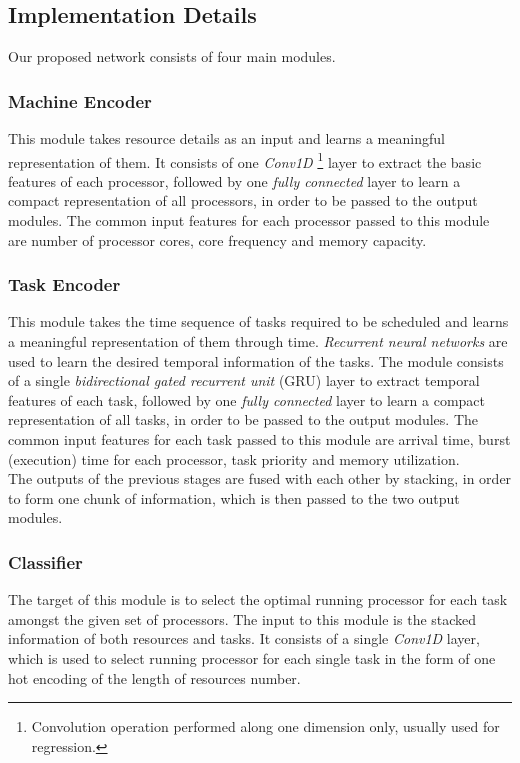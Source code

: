 \subsection{Implementation Details}
Our proposed network consists of four main modules.

\subsubsection{Machine Encoder}
This module takes resource details as an input and learns a meaningful representation of them. It consists of one \emph{Conv1D} \footnote{Convolution operation performed along one dimension only, usually used for regression.} layer to extract the basic features of each processor, followed by one \emph{fully connected} layer to learn a compact representation of all processors, in order to be passed to the output modules. The common input features for each processor passed to this module are number of processor cores, core frequency and memory capacity. \\

\subsubsection{Task Encoder}
This module takes the time sequence of tasks required to be scheduled and learns a meaningful representation of them through time. \emph{Recurrent neural networks} are used to learn the desired temporal information of the tasks. The module consists of a single \emph{bidirectional gated recurrent unit} (GRU) \cite{chung2014empirical} layer to extract temporal features of each task, followed by one \emph{fully connected} layer to learn a compact representation of all tasks, in order to be passed to the output modules. The common input features for each task passed to this module are arrival time, burst (execution) time for each processor, task priority and memory utilization. \\

The outputs of the previous stages are fused with each other by stacking, in order to form one chunk of information, which is then passed to the two output modules. \\

\subsubsection{Classifier}
The target of this module is to select the optimal running processor for each task amongst the given set of processors. The input to this module is the stacked information of both resources and tasks. It consists of a single \emph{Conv1D} layer, which is used to select running processor for each single task in the form of one hot encoding of the length of resources number. \\

